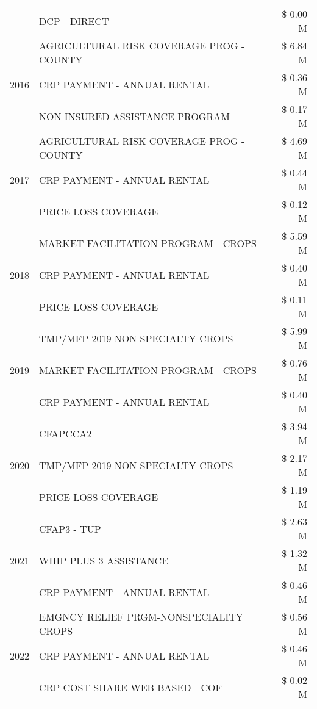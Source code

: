 \begin{tabular}{llr}
 & DCP - DIRECT & \$ 0.00 M \\
\cline{1-3}
\multirow[t]{3}{*}{2016} & AGRICULTURAL RISK COVERAGE PROG - COUNTY & \$ 6.84 M \\
 & CRP PAYMENT - ANNUAL RENTAL & \$ 0.36 M \\
 & NON-INSURED ASSISTANCE PROGRAM & \$ 0.17 M \\
\cline{1-3}
\multirow[t]{3}{*}{2017} & AGRICULTURAL RISK COVERAGE PROG - COUNTY & \$ 4.69 M \\
 & CRP PAYMENT - ANNUAL RENTAL & \$ 0.44 M \\
 & PRICE LOSS COVERAGE & \$ 0.12 M \\
\cline{1-3}
\multirow[t]{3}{*}{2018} & MARKET FACILITATION PROGRAM - CROPS & \$ 5.59 M \\
 & CRP PAYMENT - ANNUAL RENTAL & \$ 0.40 M \\
 & PRICE LOSS COVERAGE & \$ 0.11 M \\
\cline{1-3}
\multirow[t]{3}{*}{2019} & TMP/MFP 2019 NON SPECIALTY CROPS & \$ 5.99 M \\
 & MARKET FACILITATION PROGRAM - CROPS & \$ 0.76 M \\
 & CRP PAYMENT - ANNUAL RENTAL & \$ 0.40 M \\
\cline{1-3}
\multirow[t]{3}{*}{2020} & CFAPCCA2 & \$ 3.94 M \\
 & TMP/MFP 2019 NON SPECIALTY CROPS & \$ 2.17 M \\
 & PRICE LOSS COVERAGE & \$ 1.19 M \\
\cline{1-3}
\multirow[t]{3}{*}{2021} & CFAP3 - TUP & \$ 2.63 M \\
 & WHIP PLUS 3 ASSISTANCE & \$ 1.32 M \\
 & CRP PAYMENT - ANNUAL RENTAL & \$ 0.46 M \\
\cline{1-3}
\multirow[t]{3}{*}{2022} & EMGNCY RELIEF PRGM-NONSPECIALITY CROPS & \$ 0.56 M \\
 & CRP PAYMENT - ANNUAL RENTAL & \$ 0.46 M \\
 & CRP COST-SHARE WEB-BASED - COF & \$ 0.02 M \\
\cline{1-3}
\bottomrule
\end{tabular}
